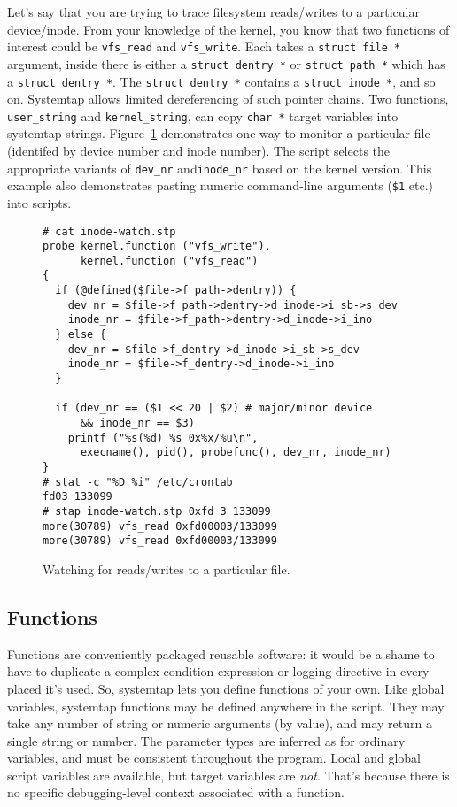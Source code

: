 \documentclass{article}
\newenvironment{boxedminipage}%
    {\begin{makeimage}\begin{center}\begin{Sbox}\begin{minipage}}%
    {\end{minipage}\end{Sbox}\fbox{\TheSbox}\end{center}\end{makeimage}}
\renewcommand{\nomenclature}[2]{}
\begin{document}
Let's say that you are trying to trace filesystem reads/writes to a
particular device/inode.  From your knowledge of the kernel, you know
that two functions of interest could be \verb+vfs_read+ and
\verb+vfs_write+.  Each takes a \verb+struct file *+ argument, inside
there is either a \verb+struct dentry *+ or \verb+struct path *+ which
has a \verb+struct dentry *+.
The \verb+struct dentry *+ contains a \verb+struct inode *+, and
so on.
Systemtap allows limited dereferencing of such pointer chains.
Two functions, \verb+user_string+ and \verb+kernel_string+, can copy
\verb+char *+ target variables into systemtap strings.
Figure~\ref{fig:inode-watch} demonstrates one way to monitor a
particular file (identifed by device number and inode number).
The script selects the appropriate variants of \verb+dev_nr+
and\verb+inode_nr+ based on the kernel version.
This example also demonstrates pasting numeric command-line arguments
(\verb+$1+ etc.) into scripts.

\begin{figure}[!ht]
\begin{boxedminipage}{4.5in}
\begin{verbatim}
# cat inode-watch.stp
probe kernel.function ("vfs_write"),
      kernel.function ("vfs_read")
{
  if (@defined($file->f_path->dentry)) {
    dev_nr = $file->f_path->dentry->d_inode->i_sb->s_dev
    inode_nr = $file->f_path->dentry->d_inode->i_ino
  } else {
    dev_nr = $file->f_dentry->d_inode->i_sb->s_dev
    inode_nr = $file->f_dentry->d_inode->i_ino
  }

  if (dev_nr == ($1 << 20 | $2) # major/minor device
      && inode_nr == $3)
    printf ("%s(%d) %s 0x%x/%u\n",
      execname(), pid(), probefunc(), dev_nr, inode_nr)
}
# stat -c "%D %i" /etc/crontab
fd03 133099
# stap inode-watch.stp 0xfd 3 133099
more(30789) vfs_read 0xfd00003/133099
more(30789) vfs_read 0xfd00003/133099
\end{verbatim}
\end{boxedminipage}
\caption{Watching for reads/writes to a particular file.}
\label{fig:inode-watch}
\end{figure}

\subsection{Functions}

Functions are conveniently packaged reusable software: it would be a
shame to have to duplicate a complex condition expression or logging
directive in every placed it's used.  So, systemtap lets you define
functions of your own.  Like global variables, systemtap functions may
be defined anywhere in the script.  They may take any number of string
or numeric arguments (by value), and may return a single string or
number.  The parameter types are inferred as for ordinary variables,
and must be consistent throughout the program.  Local and global
script variables are available, but target variables are {\em not}.
That's because there is no specific debugging-level context associated
with a function.
\nomenclature{function}{A clump of parametrized script statements that
may be repeatedly and recursively called from probe handlers and other
functions.}
\end{document}
